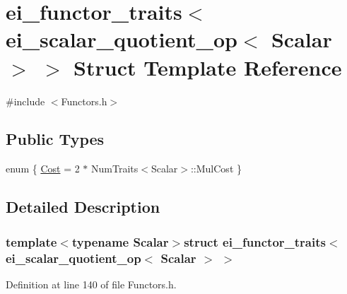 \hypertarget{structei__functor__traits_3_01ei__scalar__quotient__op_3_01_scalar_01_4_01_4}{\section{ei\-\_\-functor\-\_\-traits$<$ ei\-\_\-scalar\-\_\-quotient\-\_\-op$<$ Scalar $>$ $>$ Struct Template Reference}
\label{structei__functor__traits_3_01ei__scalar__quotient__op_3_01_scalar_01_4_01_4}
}


{\ttfamily \#include $<$Functors.\-h$>$}

\subsection*{Public Types}
\begin{DoxyCompactItemize}
\item 
enum \{ \hyperlink{structei__functor__traits_3_01ei__scalar__quotient__op_3_01_scalar_01_4_01_4_a2c8bbbd943be1b8d9a2c9a4d5b50631ba9befbd188bca42913a4cc6617e25857d}{Cost} = 2 $\ast$ Num\-Traits$<$Scalar$>$\-:\-:Mul\-Cost
 \}
\end{DoxyCompactItemize}


\subsection{Detailed Description}
\subsubsection*{template$<$typename Scalar$>$struct ei\-\_\-functor\-\_\-traits$<$ ei\-\_\-scalar\-\_\-quotient\-\_\-op$<$ Scalar $>$ $>$}



Definition at line 140 of file Functors.\-h.



